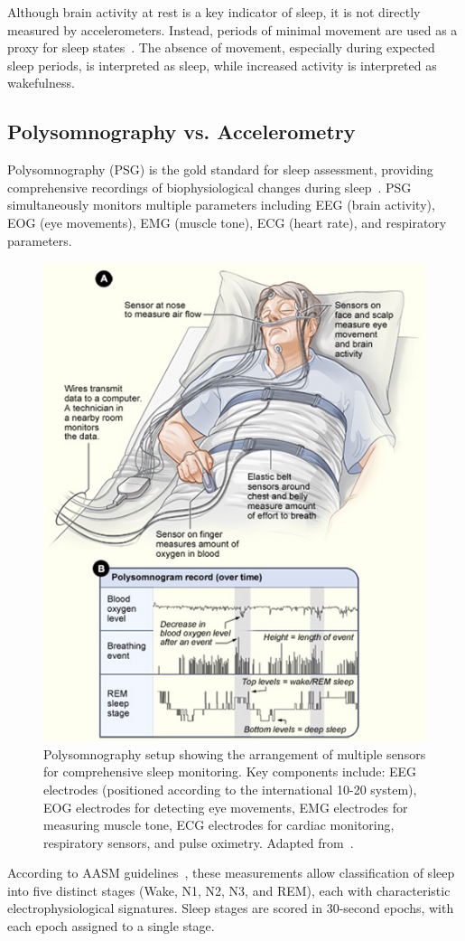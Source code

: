 \documentclass[conference]{IEEEtran}
\begin{document}
Although brain activity at rest is a key indicator of sleep, it is not directly measured by accelerometers. Instead, periods of minimal movement are used as a proxy for sleep states~\cite{pmc5781106}. The absence of movement, especially during expected sleep periods, is interpreted as sleep, while increased activity is interpreted as wakefulness.
\subsection{Polysomnography vs. Accelerometry}

Polysomnography (PSG) is the gold standard for sleep assessment, providing comprehensive recordings of biophysiological changes during sleep~\cite{rechtschaffen1968, aasm2007}. PSG simultaneously monitors multiple parameters including EEG (brain activity), EOG (eye movements), EMG (muscle tone), ECG (heart rate), and respiratory parameters.

\begin{figure}[h]
	\centering
	\includegraphics[width=0.5\linewidth]{figures/psg_setup_diagram.png}
	\caption{Polysomnography setup showing the arrangement of multiple sensors for comprehensive sleep monitoring. Key components include: EEG electrodes (positioned according to the international 10-20 system), EOG electrodes for detecting eye movements, EMG electrodes for measuring muscle tone, ECG electrodes for cardiac monitoring, respiratory sensors, and pulse oximetry. Adapted from~\cite{psychdb2023}.}
	\label{fig:psg_setup}
\end{figure}

According to AASM guidelines~\cite{aasm2007}, these measurements allow classification of sleep into five distinct stages (Wake, N1, N2, N3, and REM), each with characteristic electrophysiological signatures. Sleep stages are scored in 30-second epochs, with each epoch assigned to a single stage.
\end{document}
